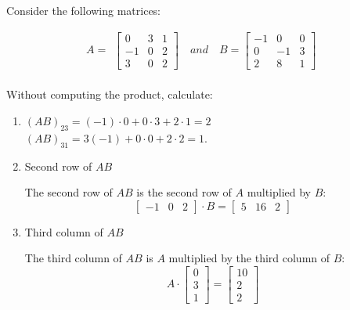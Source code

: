 \item Consider the following matrices:

$$A = \begin{aligned}
    \begin{bmatrix}
        0   &  3  & 1 \\
        -1  &  0  & 2 \\
        3   &  0  & 2
    \end{bmatrix} \quad and \quad
    B = \begin{bmatrix}
        -1 &  0   & 0 \\
        0  &  -1  & 3 \\
        2  &  8   & 1
    \end{bmatrix} 
\end{aligned}$$ \\

Without computing the product, calculate:

\begin{enumerate}[label=\alph*)]
    \item
        \begin{answer}
            $(AB)_{23} = (-1)\cdot0+0\cdot3+2\cdot1 = 2$ \\[0.5em]
            $(AB)_{31} = 3(-1)+0\cdot0+2\cdot2 = 1$.
        \end{answer}
    \item Second row of $AB$
        \begin{answer}
            The second row of $AB$ is the second row of $A$ multiplied by $B$:
            $$\begin{bmatrix}-1 & 0 & 2\end{bmatrix} \cdot B
            = \begin{bmatrix}5 & 16 & 2\end{bmatrix}$$
        \end{answer}
    \item Third column of $AB$
        \begin{answer}
            The third column of $AB$ is $A$ multiplied by the third column of $B$:
            $$A \cdot \begin{bmatrix}0 \\ 3 \\ 1\end{bmatrix}
            = \begin{bmatrix}10 \\ 2 \\ 2\end{bmatrix}$$
        \end{answer}
\end{enumerate}
